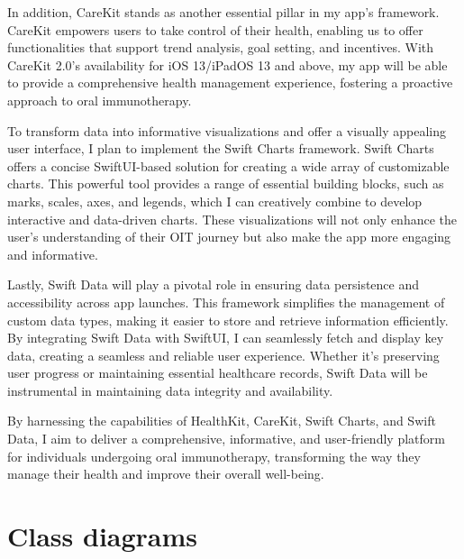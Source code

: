 In addition, CareKit stands as another essential pillar in my app's framework. CareKit empowers users to take control of their health, enabling us to offer functionalities that support trend analysis, goal setting, and incentives. With CareKit 2.0's availability for iOS 13/iPadOS 13 and above, my app will be able to provide a comprehensive health management experience, fostering a proactive approach to oral immunotherapy.

To transform data into informative visualizations and offer a visually appealing user interface, I plan to implement the Swift Charts framework. Swift Charts offers a concise SwiftUI-based solution for creating a wide array of customizable charts. This powerful tool provides a range of essential building blocks, such as marks, scales, axes, and legends, which I can creatively combine to develop interactive and data-driven charts. These visualizations will not only enhance the user's understanding of their OIT journey but also make the app more engaging and informative.

Lastly, Swift Data will play a pivotal role in ensuring data persistence and accessibility across app launches. This framework simplifies the management of custom data types, making it easier to store and retrieve information efficiently. By integrating Swift Data with SwiftUI, I can seamlessly fetch and display key data, creating a seamless and reliable user experience. Whether it's preserving user progress or maintaining essential healthcare records, Swift Data will be instrumental in maintaining data integrity and availability.

By harnessing the capabilities of HealthKit, CareKit, Swift Charts, and Swift Data, I aim to deliver a comprehensive, informative, and user-friendly platform for individuals undergoing oral immunotherapy, transforming the way they manage their health and improve their overall well-being.

\section{Class diagrams}

